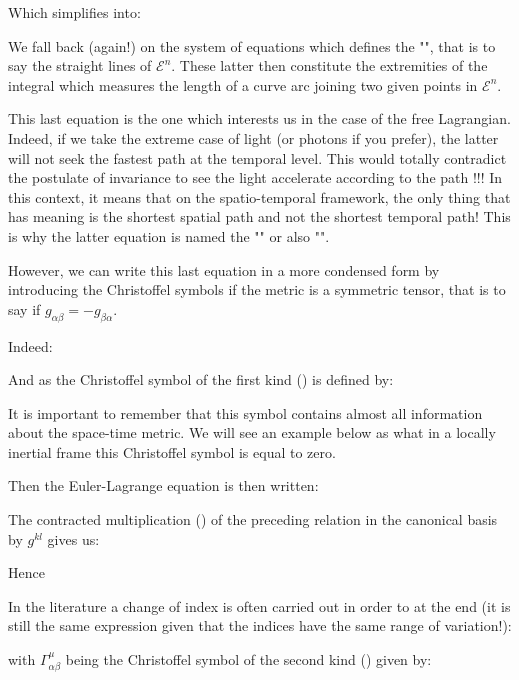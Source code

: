 	Which simplifies into:
	
	We fall back (again!) on the system of equations which defines the "", that is to say the straight lines of $\mathcal{E}^n$. These latter then constitute the extremities of the integral which measures the length of a curve arc joining two given points in $\mathcal{E}^n$.

	This last equation is the one which interests us in the case of the free Lagrangian. Indeed, if we take the extreme case of light (or photons if you prefer), the latter will not seek the fastest path at the temporal level. This would totally contradict the postulate of invariance to see the light accelerate according to the path !!! In this context, it means that on the spatio-temporal framework, the only thing that has meaning is the shortest spatial path and not the shortest temporal path! This is why the latter equation is named the "" or also "".

	However, we can write this last equation in a more condensed form by introducing the Christoffel symbols if the metric is a symmetric tensor, that is to say if $g_{\alpha\beta}=-g_{\beta\alpha}$.
	
	Indeed:
	
	And as the Christoffel symbol of the first kind () is defined by:
	
	\begin{tcolorbox}[title=Remark,colframe=black,arc=10pt]
	It is important to remember that this symbol contains almost all information about the space-time metric. We will see an example below as what in a locally inertial frame this Christoffel symbol is equal to zero.
	\end{tcolorbox}
	Then the Euler-Lagrange equation is then written:
	
	The contracted multiplication () of the preceding relation in the canonical basis by $g^{kl}$ gives us:
	
	Hence
	
	In the literature a change of index is often carried out in order to at the end (it is still the same expression given that the indices have the same range of variation!):
	
	with $\Gamma_{\alpha\beta}^\mu$ being the Christoffel symbol of the second kind () given by:
	

